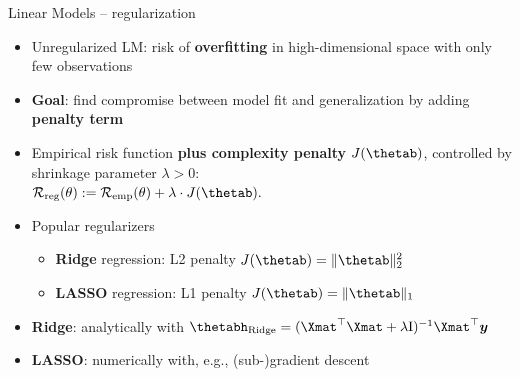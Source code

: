 \begin{frame}{Linear Models -- regularization}


\begin{itemize}
  \item Unregularized LM: risk of \textbf{overfitting} in high-dimensional 
  space with only few observations
  \item \textbf{Goal}: find compromise between model fit and generalization by 
  adding \textbf{penalty term}
\end{itemize}

\medskip




\medskip


\begin{itemize}
  \item Empirical risk function \textbf{plus complexity penalty} 
  $J(\thetab)$, controlled by shrinkage parameter $\lambda > 0$: \\
  $\riskrt := \risket + \lambda \cdot J(\thetab).$ 
  \item Popular regularizers
  \begin{itemize} 
    \item \textbf{Ridge} regression: L2 penalty $J(\thetab) = \|\thetab\|_2^2 $
    \item \textbf{LASSO} regression: L1 penalty $J(\thetab) = \|\thetab\|_1 $
  \end{itemize}
\end{itemize}

\medskip

\begin{itemize}
  \item \textbf{Ridge}: analytically with 
  $\thetabh_{\text{Ridge}} = (\Xmat^\top \Xmat  + \lambda \id)^{-1} \Xmat^\top 
  \yv$
  \item \textbf{LASSO}: numerically with, e.g., (sub-)gradient descent
\end{itemize}

\end{frame}

